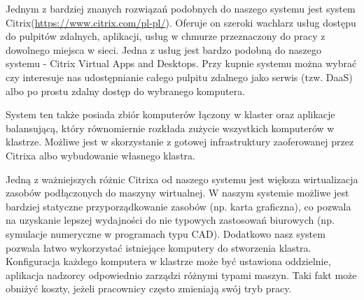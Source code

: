\documentclass[../wstep.tex]{subfiles}
\begin{document}
	
Jednym z bardziej znanych rozwiązań podobnych do naszego systemu jest system Citrix(\url{https://www.citrix.com/pl-pl/}).
Oferuje on szeroki wachlarz usług dostępu do pulpitów zdalnych, aplikacji, usług w chmurze przeznaczony do pracy z dowolnego miejsca w sieci.
Jedna z usług jest bardzo podobną do naszego systemu - Citrix Virtual Apps and Desktops\parencite{citrix-daas}.
Przy kupnie systemu można wybrać czy interesuje nas udostępnianie całego pulpitu zdalnego jako serwis (tzw. DaaS) albo po prostu zdalny dostęp do wybranego komputera.

System ten także posiada zbiór komputerów łączony w klaster oraz aplikacje balansującą, który równomiernie rozkłada zużycie wszystkich komputerów w klastrze.
Możliwe jest w skorzystanie z gotowej infrastruktury zaoferowanej przez Citrixa albo wybudowanie własnego klastra. 

Jedną z ważniejszych różnic Citrixa od naszego systemu jest większa wirtualizacja zasobów podłączonych do maszyny wirtualnej.
W naszym systemie możliwe jest bardziej statyczne przyporządkowanie zasobów (np. karta graficzna), co pozwala na uzyskanie lepszej wydajności do nie typowych zastosowań biurowych (np. symulacje numeryczne w programach typu CAD).
Dodatkowo nasz system pozwala łatwo wykorzystać istniejące komputery do stworzenia klastra.
Konfiguracja każdego komputera w klastrze może być ustawiona oddzielnie, aplikacja nadzorcy odpowiednio zarządzi różnymi typami maszyn.
Taki fakt może obniżyć koszty, jeżeli pracownicy często zmieniają swój tryb pracy.
	
\end{document}
